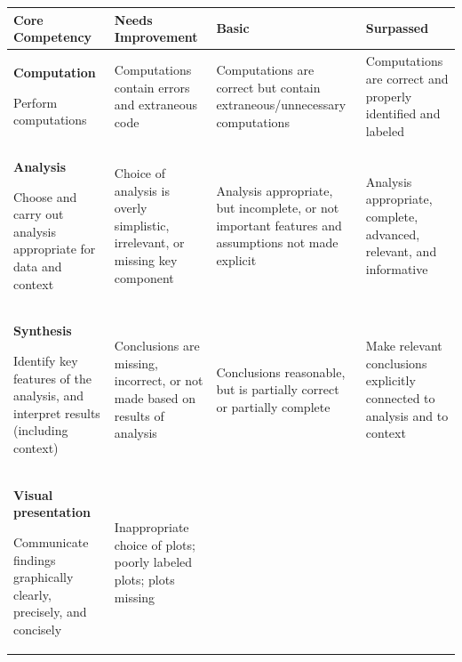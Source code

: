 \begin{tabular}{| p{4cm} | p{4cm} | p{4cm} | p{4cm} |}


\hline




Core Competency & Needs Improvement & Basic & Surpassed \\


\hline


\hline 


\textbf{Computation}


Perform computations &


Computations contain errors and extraneous code &


Computations are correct but contain extraneous/unnecessary computations &


Computations are correct and properly identified and labeled \\


\hline


\textbf{Analysis}


Choose and carry out analysis appropriate for data and context &


Choice of analysis is overly simplistic, irrelevant, or missing key component &


Analysis appropriate, but incomplete, or not important features and assumptions not made explicit &


Analysis appropriate, complete, advanced, relevant, and informative \\


\hline


\textbf{Synthesis}


Identify key features of the analysis, and interpret results (including context) &


Conclusions are missing, incorrect, or not made based on results of analysis &


Conclusions reasonable, but is partially correct or partially complete &


Make relevant conclusions explicitly connected to analysis and to context \\


\hline


\textbf{Visual presentation}


Communicate findings graphically clearly, precisely, and concisely & 


Inappropriate choice of plots; poorly labeled plots; plots missing &



\end{tabular}
